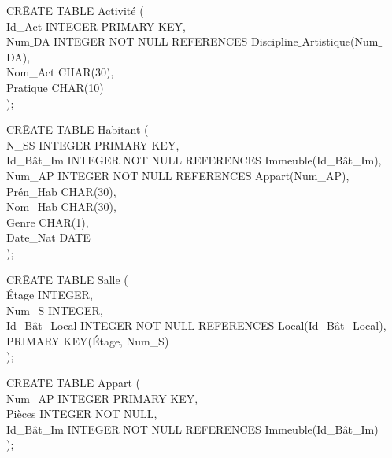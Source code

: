 \documentclass[a4paper,10.5pt]{report}
\begin{document}
		\begin{tabbing}
			CR\=EATE TABLE Activité (\\
			\> Id\_Act INTEGER PRIMARY KEY,\\
			\> Num$\_$DA INTEGER NOT NULL REFERENCES Discipline$\_$Artistique(Num$\_$DA),\\
			\> Nom\_Act CHAR(30),\\
			\> Pratique CHAR(10)\\);
		\end{tabbing}

		\begin{tabbing}
			CR\=EATE TABLE Habitant (\\
			\> N\_SS INTEGER PRIMARY KEY,\\
			\> Id\_Bât\_Im INTEGER NOT NULL REFERENCES Immeuble(Id\_Bât\_Im),\\
			\> Num\_AP INTEGER NOT NULL REFERENCES Appart(Num\_AP),\\
			\> Prén\_Hab CHAR(30),\\
			\> Nom\_Hab CHAR(30),\\
			\> Genre CHAR(1),\\
			\> Date\_Nat DATE\\);
		\end{tabbing}

		\begin{tabbing}
			CR\=EATE TABLE Salle (\\
			\> Étage INTEGER,\\
			\> Num\_S INTEGER,\\
			\> Id\_Bât\_Local INTEGER NOT NULL REFERENCES Local(Id\_Bât\_Local),\\
			\> PRIMARY KEY(Étage, Num\_S)\\);
		\end{tabbing}

		\begin{tabbing}
			CR\=EATE TABLE Appart (\\
			\> Num\_AP INTEGER PRIMARY KEY,\\
			\> Pièces INTEGER NOT NULL,\\
			\> Id\_Bât\_Im INTEGER NOT NULL REFERENCES Immeuble(Id\_Bât\_Im)\\);
		\end{tabbing}
                                                   
\end{document}
